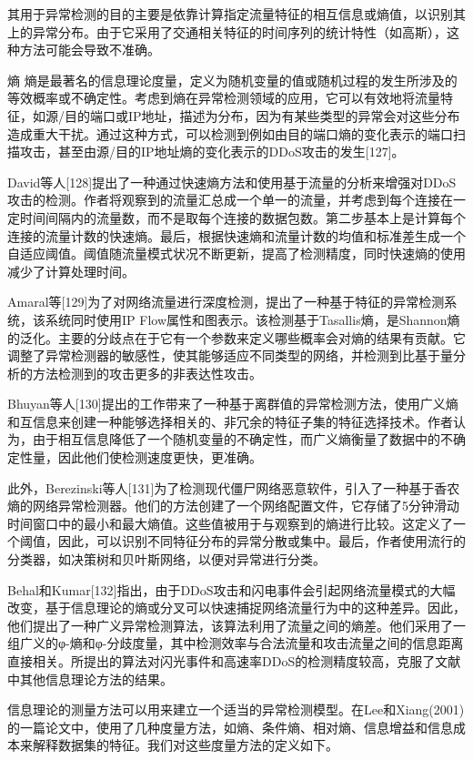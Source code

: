 其用于异常检测的目的主要是依靠计算指定流量特征的相互信息或熵值，以识别其上的异常分布。由于它采用了交通相关特征的时间序列的统计特性（如高斯），这种方法可能会导致不准确。

熵
熵是最著名的信息理论度量，定义为随机变量的值或随机过程的发生所涉及的等效概率或不确定性。考虑到熵在异常检测领域的应用，它可以有效地将流量特征，如源/目的端口或IP地址，描述为分布，因为有某些类型的异常会对这些分布造成重大干扰。通过这种方式，可以检测到例如由目的端口熵的变化表示的端口扫描攻击，甚至由源/目的IP地址熵的变化表示的DDoS攻击的发生[127]。

David等人[128]提出了一种通过快速熵方法和使用基于流量的分析来增强对DDoS攻击的检测。作者将观察到的流量汇总成一个单一的流量，并考虑到每个连接在一定时间间隔内的流量数，而不是取每个连接的数据包数。第二步基本上是计算每个连接的流量计数的快速熵。最后，根据快速熵和流量计数的均值和标准差生成一个自适应阈值。阈值随流量模式状况不断更新，提高了检测精度，同时快速熵的使用减少了计算处理时间。

Amaral等[129]为了对网络流量进行深度检测，提出了一种基于特征的异常检测系统，该系统同时使用IP Flow属性和图表示。该检测基于Tasallis熵，是Shannon熵的泛化。主要的分歧点在于它有一个参数来定义哪些概率会对熵的结果有贡献。它调整了异常检测器的敏感性，使其能够适应不同类型的网络，并检测到比基于量分析的方法检测到的攻击更多的非表达性攻击。

Bhuyan等人[130]提出的工作带来了一种基于离群值的异常检测方法，使用广义熵和互信息来创建一种能够选择相关的、非冗余的特征子集的特征选择技术。作者认为，由于相互信息降低了一个随机变量的不确定性，而广义熵衡量了数据中的不确定性量，因此他们使检测速度更快，更准确。

此外，Berezinski等人[131]为了检测现代僵尸网络恶意软件，引入了一种基于香农熵的网络异常检测器。他们的方法创建了一个网络配置文件，它存储了5分钟滑动时间窗口中的最小和最大熵值。这些值被用于与观察到的熵进行比较。这定义了一个阈值，因此，可以识别不同特征分布的异常分散或集中。最后，作者使用流行的分类器，如决策树和贝叶斯网络，以便对异常进行分类。

Behal和Kumar[132]指出，由于DDoS攻击和闪电事件会引起网络流量模式的大幅改变，基于信息理论的熵或分叉可以快速捕捉网络流量行为中的这种差异。因此，他们提出了一种广义异常检测算法，该算法利用了流量之间的熵差。他们采用了一组广义的φ-熵和φ-分歧度量，其中检测效率与合法流量和攻击流量之间的信息距离直接相关。所提出的算法对闪光事件和高速率DDoS的检测精度较高，克服了文献中其他信息理论方法的结果。

信息理论的测量方法可以用来建立一个适当的异常检测模型。在Lee和Xiang(2001)的一篇论文中，使用了几种度量方法，如熵、条件熵、相对熵、信息增益和信息成本来解释数据集的特征。我们对这些度量方法的定义如下。


